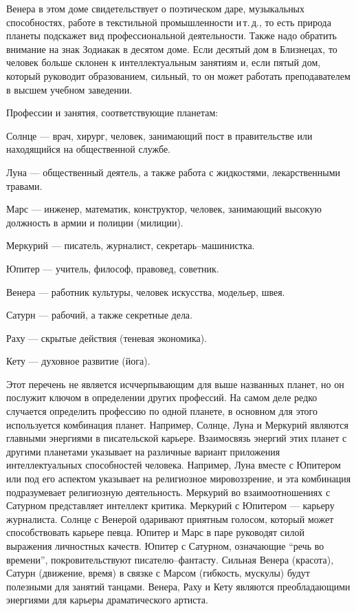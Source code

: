 Венера в этом доме свидетельствует о поэтическом даре, музыкальных способностях, работе в текстильной промышленности и\,т.\,д., то есть природа планеты подскажет вид профессиональной деятельности. Также надо обратить внимание на знак Зодиакак в десятом доме. Если десятый дом в Близнецах, то человек больше склонен к интеллектуальным занятиям и, если пятый дом, который руководит образованием, сильный, то он может работать преподавателем в высшем учебном заведении.

Профессии и занятия, соответствующие планетам:
\begin{myenum}
	\item Солнце --- врач, хирург, человек, занимающий пост в правительстве или находящийся на общественной службе.
	\item Луна --- общественный деятель, а также работа с жидкостями, лекарственными травами.
	\item Марс --- инженер, математик, конструктор, человек, занимающий высокую должность в армии и полиции (милиции).
	\item Меркурий --- писатель, журналист, секретарь--машинистка.
	\item Юпитер --- учитель, философ, правовед, советник.
	\item Венера --- работник культуры, человек искусства, модельер, швея.
	\item Сатурн --- рабочий, а также секретные дела.
	\item Раху --- скрытые действия (теневая экономика).
	\item Кету --- духовное развитие (йога).
\end{myenum}

Этот перечень не является исччерпывающим для выше названных планет, но он послужит ключом в определении других профессий. На самом деле редко случается определить профессию по одной планете, в основном для этого используется комбинация планет. Например, Солнце, Луна и Меркурий являются главными энергиями в писательской карьере. Взаимосвязь энергий этих планет с другими планетами указывает на различные вариант приложения интеллектуальных способностей человека. Например, Луна вместе с Юпитером или под его аспектом указывает на религиозное мировоззрение, и эта комбинация подразумевает религиозную деятельность. Меркурий во взаимоотношениях с Сатурном представляет интеллект критика. Меркурий с Юпитером --- карьеру журналиста. Солнце с Венерой одаривают приятным голосом, который может способствовать карьере певца. Юпитер и Марс в паре руководят силой выражения личностных качеств. Юпитер с Сатурном, означающие ``речь во времени'', покровительствуют писателю--фантасту. Сильная Венера (красота), Сатурн (движение, время) в связке с Марсом (гибкость, мускулы) будут полезными для занятий танцами. Венера, Раху и Кету являются преобладающими энергиями для карьеры драматического артиста.

